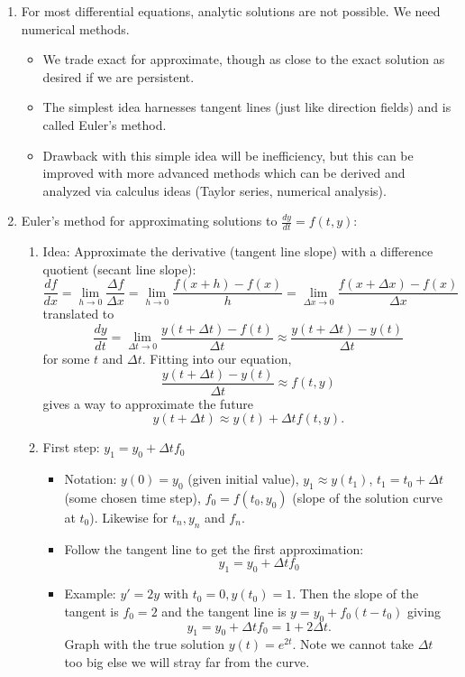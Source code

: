 \documentclass{article}
\newcommand{\ds}{\displaystyle}
\begin{document}
\begin{enumerate}

\item For most differential equations, analytic solutions are not possible. We need numerical methods. 
\begin{itemize}
\item We trade exact for approximate, though as close to the exact solution as desired if we are persistent.
\item The simplest idea harnesses tangent lines (just like direction fields) and is called Euler's method.
\item Drawback with this simple idea will be inefficiency, but this can be improved with more advanced methods which can be derived and analyzed via calculus ideas (Taylor series, numerical analysis).
\end{itemize}


\item Euler's method for approximating solutions to $\ds \frac{dy}{dt} = f(t,y)$:
\begin{enumerate}
\item Idea: Approximate the derivative (tangent line slope) with a difference quotient (secant line slope):
\[
\frac{df}{dx} = \lim_{h \rightarrow 0} \frac{\Delta f}{\Delta x}  
= \lim_{h \rightarrow 0} \frac{f(x+h)-f(x)}{h}  
= \lim_{\Delta x \rightarrow 0} \frac{f(x+\Delta x)-f(x)}{\Delta x} 
\]
translated to
\[
\frac{dy}{dt} =  \lim_{\Delta t \rightarrow 0} \frac{y(t+\Delta t)-f(t)}{\Delta t} \approx  \frac{y(t+\Delta t)-y(t)}{\Delta t}  
\]
for some $t$ and $\Delta t$. Fitting into our equation,
\[
\frac{y(t+\Delta t) - y(t)}{\Delta t} \approx f(t,y)
\]
gives a way to approximate the future
\[
y(t + \Delta t) \approx y(t) + \Delta t f(t,y).
\]

\item First step: $y_1 = y_0 + \Delta t f_0$
\begin{itemize}
\item Notation: $y(0)=y_0$ (given initial value), $y_1 \approx y(t_1)$, $t_1 = t_0+\Delta t$ (some chosen time step), $f_0=f(t_0, y_0)$ (slope of the solution curve at $t_0$). Likewise for $t_n, y_n$ and $f_n$.
\item Follow the tangent line to get the first approximation:
\[
y_1 = y_0 + \Delta t f_0
\]
\item Example: $y'=2y$ with $t_0=0, y(t_0)=1$. Then the slope of the tangent is $f_0=2$ and the tangent line is $y=y_0+f_0(t-t_0)$ giving 
\[
y_1=y_0+\Delta t f_0=1+2\Delta t.
\]
Graph with the true solution $y(t)=e^{2t}$. Note we cannot take $\Delta t$ too big else we will stray far from the curve. 
\end{itemize}


\end{enumerate}
\end{enumerate}
\end{document}
